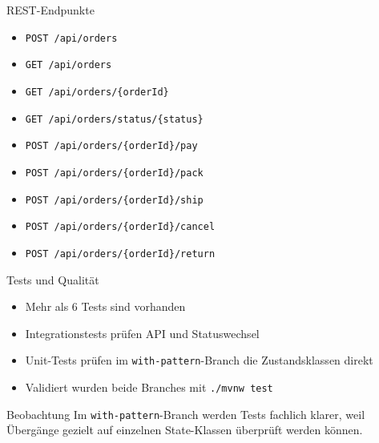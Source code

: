 \documentclass[aspectratio=169]{beamer}
\begin{document}
\begin{frame}{REST-Endpunkte}
  \small
  \begin{itemize}
    \item \texttt{POST /api/orders}
    \item \texttt{GET /api/orders}
    \item \texttt{GET /api/orders/\{orderId\}}
    \item \texttt{GET /api/orders/status/\{status\}}
    \item \texttt{POST /api/orders/\{orderId\}/pay}
    \item \texttt{POST /api/orders/\{orderId\}/pack}
    \item \texttt{POST /api/orders/\{orderId\}/ship}
    \item \texttt{POST /api/orders/\{orderId\}/cancel}
    \item \texttt{POST /api/orders/\{orderId\}/return}
  \end{itemize}
\end{frame}

\begin{frame}{Tests und Qualität}
  \begin{itemize}
    \item Mehr als 6 Tests sind vorhanden
    \item Integrationstests prüfen API und Statuswechsel
    \item Unit-Tests prüfen im \texttt{with-pattern}-Branch die Zustandsklassen direkt
    \item Validiert wurden beide Branches mit \texttt{./mvnw test}
  \end{itemize}
  \vspace{0.3cm}
  \begin{block}{Beobachtung}
    Im \texttt{with-pattern}-Branch werden Tests fachlich klarer, weil Übergänge gezielt auf einzelnen State-Klassen überprüft werden können.
  \end{block}
\end{frame}
\end{document}
